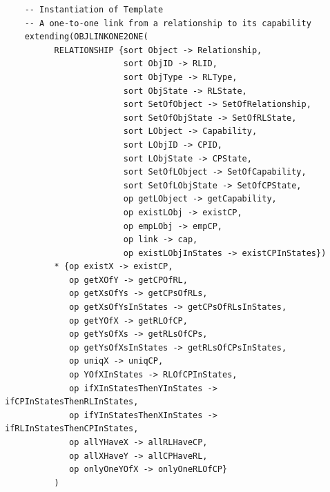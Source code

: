 \documentclass[12pt]{report}
\begin{document}
\begin{verbatim}
    -- Instantiation of Template
    -- A one-to-one link from a relationship to its capability
    extending(OBJLINKONE2ONE(
          RELATIONSHIP {sort Object -> Relationship,
                        sort ObjID -> RLID,
                        sort ObjType -> RLType,
                        sort ObjState -> RLState,
                        sort SetOfObject -> SetOfRelationship,
                        sort SetOfObjState -> SetOfRLState,
                        sort LObject -> Capability,
                        sort LObjID -> CPID,
                        sort LObjState -> CPState,
                        sort SetOfLObject -> SetOfCapability,
                        sort SetOfLObjState -> SetOfCPState,
                        op getLObject -> getCapability,
                        op existLObj -> existCP,
                        op empLObj -> empCP,
                        op link -> cap,
                        op existLObjInStates -> existCPInStates})
          * {op existX -> existCP,
             op getXOfY -> getCPOfRL,
             op getXsOfYs -> getCPsOfRLs,
             op getXsOfYsInStates -> getCPsOfRLsInStates,
             op getYOfX -> getRLOfCP,
             op getYsOfXs -> getRLsOfCPs,
             op getYsOfXsInStates -> getRLsOfCPsInStates,
             op uniqX -> uniqCP,
             op YOfXInStates -> RLOfCPInStates,
             op ifXInStatesThenYInStates -> ifCPInStatesThenRLInStates,
             op ifYInStatesThenXInStates -> ifRLInStatesThenCPInStates,
             op allYHaveX -> allRLHaveCP,
             op allXHaveY -> allCPHaveRL,
             op onlyOneYOfX -> onlyOneRLOfCP}
          )
  

\end{verbatim}
\end{document}
